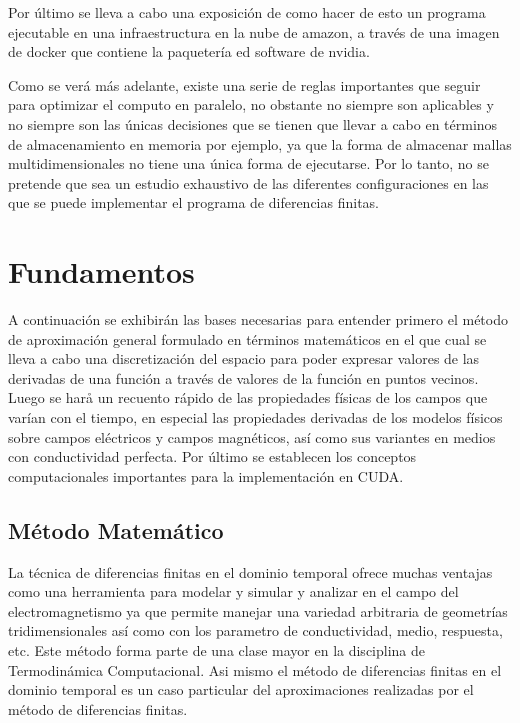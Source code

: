 \documentclass[]{article}
\begin{document}
Por último se lleva a cabo una exposición de como hacer de esto un
programa ejecutable en una infraestructura en la nube de amazon, a
través de una imagen de docker que contiene la paquetería ed software de
nvidia.

Como se verá más adelante, existe una serie de reglas importantes que
seguir para optimizar el computo en paralelo, no obstante no siempre son
aplicables y no siempre son las únicas decisiones que se tienen que
llevar a cabo en términos de almacenamiento en memoria por ejemplo, ya
que la forma de almacenar mallas multidimensionales no tiene una única
forma de ejecutarse. Por lo tanto, no se pretende que sea un estudio
exhaustivo de las diferentes configuraciones en las que se puede
implementar el programa de diferencias finitas.

\section{Fundamentos}\label{fundamentos}

A continuación se exhibirán las bases necesarias para entender primero
el método de aproximación general formulado en términos matemáticos en
el que cual se lleva a cabo una discretización del espacio para poder
expresar valores de las derivadas de una función a través de valores de
la función en puntos vecinos. Luego se harå un recuento rápido de las
propiedades físicas de los campos que varían con el tiempo, en especial
las propiedades derivadas de los modelos físicos sobre campos eléctricos
y campos magnéticos, así como sus variantes en medios con conductividad
perfecta. Por último se establecen los conceptos computacionales
importantes para la implementación en CUDA.

\subsection{Método Matemático}\label{metodo-matematico}

La técnica de diferencias finitas en el dominio temporal ofrece muchas
ventajas como una herramienta para modelar y simular y analizar en el
campo del electromagnetismo ya que permite manejar una variedad
arbitraria de geometrías tridimensionales así como con los parametro de
conductividad, medio, respuesta, etc. Este método forma parte de una
clase mayor en la disciplina de Termodinámica Computacional. Asi mismo
el método de diferencias finitas en el dominio temporal es un caso
particular del aproximaciones realizadas por el método de diferencias
finitas.
\end{document}
